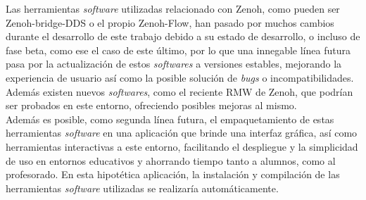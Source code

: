 Las herramientas \textit{software} utilizadas relacionado con Zenoh, como pueden
ser Zenoh-bridge-DDS o el propio Zenoh-Flow, han pasado por muchos cambios
durante el desarrollo de este trabajo debido a su estado de desarrollo, o
incluso de fase beta, como ese el caso de este último, por lo que una innegable
línea futura pasa por la actualización de estos \textit{softwares} a versiones
estables, mejorando la experiencia de usuario así como la posible solución de
\textit{bugs} o incompatibilidades.
Además existen nuevos \textit{softwares}, como el reciente RMW de Zenoh, que
podrían ser probados en este entorno, ofreciendo posibles mejoras al mismo.
\\

Además es posible, como segunda línea futura, el empaquetamiento de estas
herramientas \textit{software} en una aplicación que brinde una interfaz
gráfica, así como herramientas interactivas a este entorno, facilitando el
despliegue y la simplicidad de uso en entornos educativos y ahorrando tiempo
tanto a alumnos, como al profesorado.
En esta hipotética aplicación, la instalación y compilación de las herramientas
\textit{software} utilizadas se realizaría automáticamente.
\\
